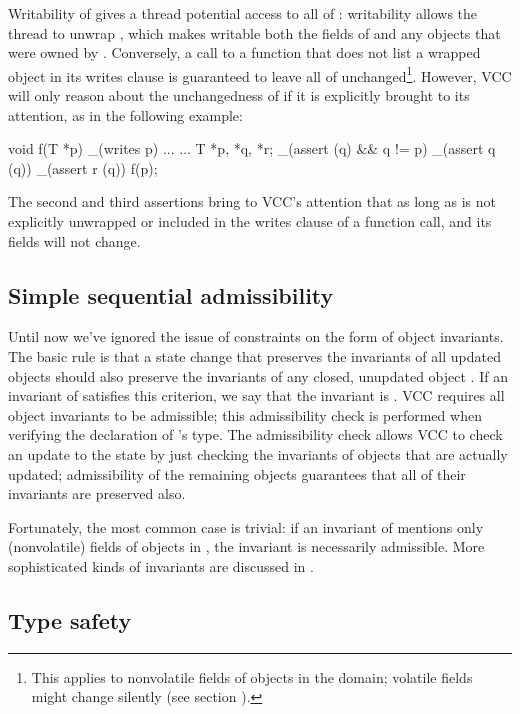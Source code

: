 Writability of  gives a thread potential access to all of
: writability allows the thread to unwrap ,
which makes writable both the fields of  and any objects that were
owned by . Conversely, a call to a function that does not list
a wrapped object  in its writes clause is guaranteed to leave 
all of  unchanged\footnote{
  This applies to nonvolatile fields of objects in
  the domain; volatile fields might change silently (see section ).
}. However, VCC will only reason about the unchangedness of
 if it is explicitly brought to its attention, as in
the following example:

\begin{VCC}
void f(T *p) 
  _(writes p) { ... }
...
T *p, *q, *r;
_(assert \wrapped(q) && q != p)
_(assert q \in \domain(q))
_(assert r \in \domain(q))
f(p);
\end{VCC}
\noindent
The second and third assertions bring to VCC's attention that as long
as  is not explicitly unwrapped or included in the writes
clause of a function call,  and its fields will not change.

\subsection{Simple sequential admissibility}
\label{sect:admissibility0}

Until now we've ignored the issue of constraints on the form of object invariants.
The basic rule is that a state change that preserves the invariants of
all updated objects should also preserve the invariants of any closed,
unupdated object . If an invariant of  satisfies this
criterion, we say that the invariant is . VCC requires
all object invariants to be admissible; this admissibility check is
performed when verifying the declaration of 's type.
The admissibility check allows VCC to check an update to the state by
just checking the invariants of objects that are actually updated;
admissibility of the remaining objects guarantees that all of their
invariants are preserved also.

Fortunately, the most common case is trivial: if an invariant of
 mentions only (nonvolatile) fields of objects in
, the invariant is necessarily admissible.
More sophisticated kinds of invariants are discussed in .

\subsection{Type safety}
\label{sect:type-safety}

